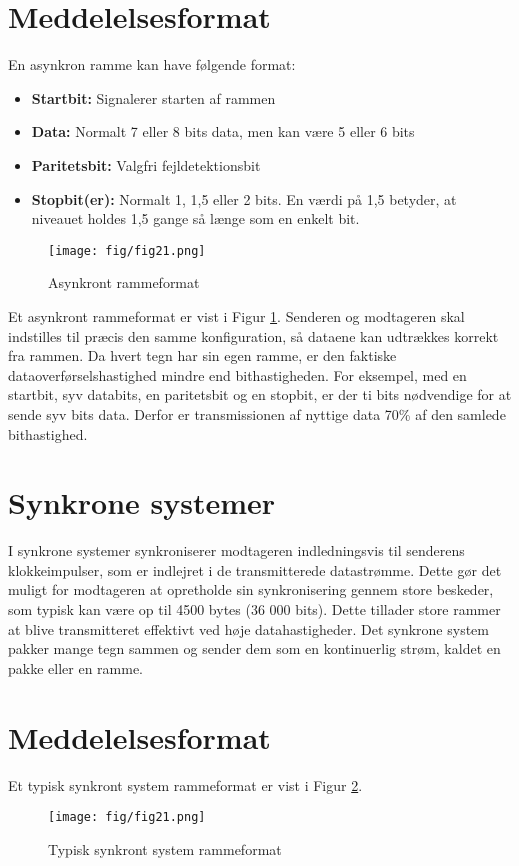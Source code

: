 \section{Meddelelsesformat}
En asynkron ramme kan have følgende format:
\begin{itemize}
	\item \textbf{Startbit:} Signalerer starten af rammen
	\item \textbf{Data:} Normalt 7 eller 8 bits data, men kan være 5 eller 6 bits
	\item \textbf{Paritetsbit:} Valgfri fejldetektionsbit
	\item \textbf{Stopbit(er):} Normalt 1, 1,5 eller 2 bits. En værdi på 1,5 betyder, at niveauet holdes 1,5 gange så længe som en enkelt bit.
\end{itemize}

\begin{figure}[h]
	\centering
	\texttt{[image: fig/fig21.png]}
	\caption{Asynkront rammeformat}
	\label{fig:asynchronous_frame}
\end{figure}
\noindent Et asynkront rammeformat er vist i Figur \ref{fig:asynchronous_frame}. Senderen og modtageren skal indstilles til præcis den samme konfiguration, så dataene kan udtrækkes korrekt fra rammen. Da hvert tegn har sin egen ramme, er den faktiske dataoverførselshastighed mindre end bithastigheden. For eksempel, med en startbit, syv databits, en paritetsbit og en stopbit, er der ti bits nødvendige for at sende syv bits data. Derfor er transmissionen af nyttige data 70\% af den samlede bithastighed.

\section{Synkrone systemer}
I synkrone systemer synkroniserer modtageren indledningsvis til senderens klokkeimpulser, som er indlejret i de transmitterede datastrømme. Dette gør det muligt for modtageren at opretholde sin synkronisering gennem store beskeder, som typisk kan være op til 4500 bytes (36 000 bits). Dette tillader store rammer at blive transmitteret effektivt ved høje datahastigheder. Det synkrone system pakker mange tegn sammen og sender dem som en kontinuerlig strøm, kaldet en pakke eller en ramme.

\section{Meddelelsesformat}
Et typisk synkront system rammeformat er vist i Figur \ref{fig:synchronous_frame}.
\begin{figure}[h]
	\centering
	\texttt{[image: fig/fig21.png]}
	\caption{Typisk synkront system rammeformat}
	\label{fig:synchronous_frame}
\end{figure}

